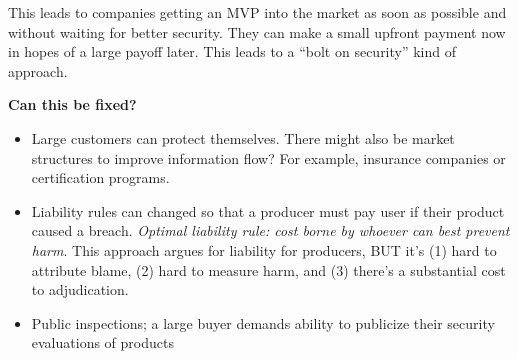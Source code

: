 This leads to companies getting an MVP into the market as soon as possible and without waiting for better security. They can make a small upfront payment now in hopes of a large payoff later. This leads to a ``bolt on security'' kind of approach. 

\textbf{Can this be fixed?}
\begin{itemize}
	\item Large customers can protect themselves. There might also be market structures to improve information flow? For example, insurance companies or certification programs.
	\item Liability rules can changed so that a producer must pay user if their product caused a breach. \textit{Optimal liability rule: cost borne by whoever can best prevent harm}. This approach argues for liability for producers, BUT it's (1) hard to attribute blame, (2) hard to measure harm, and (3) there's a substantial cost to adjudication.
	\item Public inspections; a large buyer demands ability to publicize their security evaluations of products 
\end{itemize}


